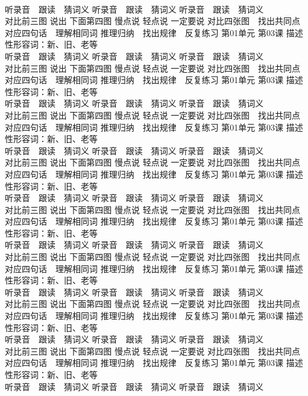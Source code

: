 \documentclass[8pt]{extreport}
\begin{document}
\begin{CJK}{UTF8}{min}
\\	听录音　跟读　猜词义 听录音　跟读　猜词义 听录音　跟读　猜词义 
\\	对比前三图 说出 下面第四图 慢点说 轻点说 一定要说	对比四张图　找出共同点 对应四句话　理解相同词 推理归纳　找出规律　反复练习 第01单元 第03课 描述性形容词：新、旧、老等
\\	听录音　跟读　猜词义 听录音　跟读　猜词义 听录音　跟读　猜词义 
\\	对比前三图 说出 下面第四图 慢点说 轻点说 一定要说	对比四张图　找出共同点 对应四句话　理解相同词 推理归纳　找出规律　反复练习 第01单元 第03课 描述性形容词：新、旧、老等
\\	听录音　跟读　猜词义 听录音　跟读　猜词义 听录音　跟读　猜词义 
\\	对比前三图 说出 下面第四图 慢点说 轻点说 一定要说	对比四张图　找出共同点 对应四句话　理解相同词 推理归纳　找出规律　反复练习 第01单元 第03课 描述性形容词：新、旧、老等
\\	听录音　跟读　猜词义 听录音　跟读　猜词义 听录音　跟读　猜词义 
\\	对比前三图 说出 下面第四图 慢点说 轻点说 一定要说	对比四张图　找出共同点 对应四句话　理解相同词 推理归纳　找出规律　反复练习 第01单元 第03课 描述性形容词：新、旧、老等
\\	听录音　跟读　猜词义 听录音　跟读　猜词义 听录音　跟读　猜词义 
\\	对比前三图 说出 下面第四图 慢点说 轻点说 一定要说	对比四张图　找出共同点 对应四句话　理解相同词 推理归纳　找出规律　反复练习 第01单元 第03课 描述性形容词：新、旧、老等
\\	听录音　跟读　猜词义 听录音　跟读　猜词义 听录音　跟读　猜词义 
\\	对比前三图 说出 下面第四图 慢点说 轻点说 一定要说	对比四张图　找出共同点 对应四句话　理解相同词 推理归纳　找出规律　反复练习 第01单元 第03课 描述性形容词：新、旧、老等
\\	听录音　跟读　猜词义 听录音　跟读　猜词义 听录音　跟读　猜词义 
\\	对比前三图 说出 下面第四图 慢点说 轻点说 一定要说	对比四张图　找出共同点 对应四句话　理解相同词 推理归纳　找出规律　反复练习 第01单元 第03课 描述性形容词：新、旧、老等
\\	听录音　跟读　猜词义 听录音　跟读　猜词义 听录音　跟读　猜词义 
\\	对比前三图 说出 下面第四图 慢点说 轻点说 一定要说	对比四张图　找出共同点 对应四句话　理解相同词 推理归纳　找出规律　反复练习 第01单元 第03课 描述性形容词：新、旧、老等
\\	听录音　跟读　猜词义 听录音　跟读　猜词义 听录音　跟读　猜词义 

\end{CJK}
\end{document}
